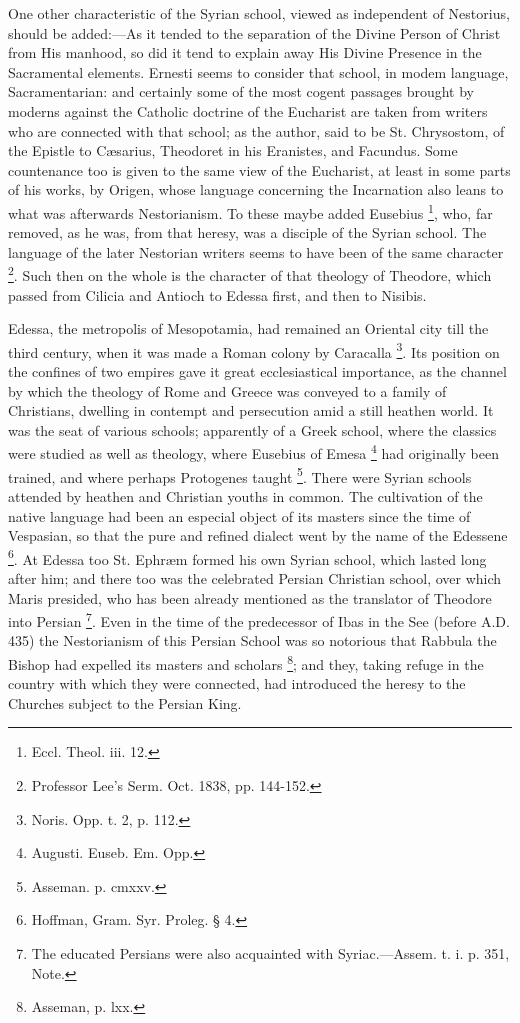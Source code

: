 One other characteristic of the Syrian school, viewed as
independent of Nestorius, should be added:—As it tended to the
separation of the Divine Person of Christ from His manhood, so did it
tend to explain away His Divine Presence in the Sacramental elements.
Ernesti seems to consider that school, in modem language,
Sacramentarian: and certainly some of the most cogent passages brought
by moderns against the Catholic doctrine of the Eucharist are taken
from writers who are connected with that school; as the author, said
to be St. Chrysostom, of the Epistle to Cæsarius, Theodoret in his
Eranistes, and Facundus. Some countenance too is given to the same
view of the Eucharist, at least in some parts of his works, by Origen,
whose language concerning the Incarnation also leans to what was afterwards Nestorianism. To these maybe added Eusebius \footnote{Eccl. Theol. iii. 12.}, who, far removed, as he was, from that heresy, was a disciple
of the Syrian school. The language of the later Nestorian writers
seems to have been of the same character \footnote{Professor Lee's Serm. Oct. 1838, pp.
144-152.}. Such then on the whole is the character of that theology of
Theodore, which passed from Cilicia and Antioch to Edessa first, and
then to Nisibis.

Edessa, the metropolis of Mesopotamia, had remained an Oriental
city till the third century, when it was made a Roman colony by
Caracalla \footnote{Noris. Opp. t. 2, p. 112.}. Its
position on the confines of two empires gave it great ecclesiastical
importance, as the channel by which the theology of Rome and Greece
was conveyed to a family of Christians, dwelling in contempt and
persecution amid a still heathen world. It was the seat of various
schools; apparently of a Greek school, where the classics were studied
as well as theology, where Eusebius of Emesa \footnote{Augusti. Euseb. Em. Opp.} had originally been trained, and where perhaps Protogenes
taught \footnote{Asseman. p. cmxxv.}. There were
Syrian schools attended by heathen and Christian youths in common. The
cultivation of the native language had been an especial object of its
masters since the time of Vespasian, so that the pure and refined
dialect went by the name of the Edessene \footnote{Hoffman, Gram. Syr. Proleg. § 4.}. At Edessa too St. Ephræm formed his own Syrian school, which
lasted long after him; and there too was the celebrated Persian
Christian school, over which Maris presided, who has been already
mentioned as the translator of Theodore into Persian \footnote{The educated Persians were also acquainted
with Syriac.—Assem. t. i. p. 351, Note.}. Even in the time of the predecessor of Ibas in the See
(before A.D. 435) the Nestorianism of this
Persian School was so notorious that Rabbula the Bishop had expelled
its masters and scholars \footnote{Asseman, p. lxx.}; and they, taking refuge in the country with which they were
connected, had introduced the heresy to the Churches subject to the
Persian King.

